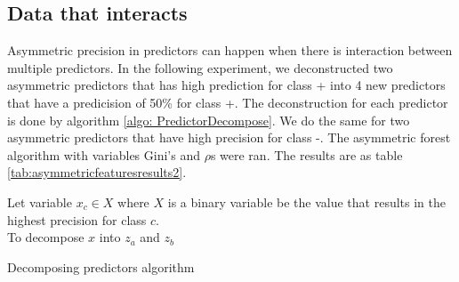 \subsection{Data that interacts}
Asymmetric precision in predictors can happen when there is interaction between multiple predictors. In the following experiment, we deconstructed two asymmetric predictors that has high prediction for class + into 4 new predictors that have a predicision of 50\% for class +. The deconstruction for each predictor is done by algorithm \ref{algo: PredictorDecompose}. We do the same for two asymmetric predictors that have high precision for class -. The asymmetric forest algorithm with variables Gini's and $\rho$s were ran. The results are as table \ref{tab:asymmetricfeaturesresults2}. 
\begin{algorithm}
Let variable $x_c\in X$ where $X$ is a binary variable be the value that results in the highest precision for class $c$.\\
To decompose $x$ into $z_a$ and $z_b$

\caption{Decomposing predictors algorithm}\label{algo: PredictorDecompose}
\end{algorithm}


